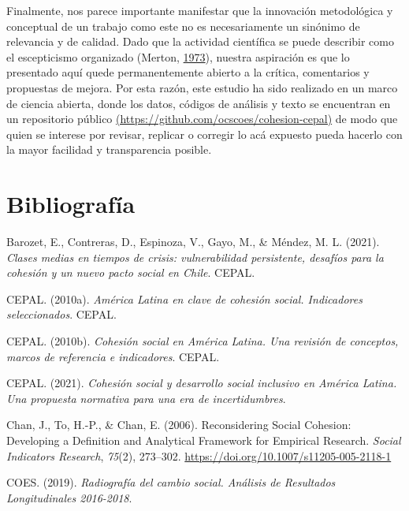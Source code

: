 \documentclass[
  12pt,
]{book}
\begin{document}
Finalmente, nos parece importante manifestar que la innovación metodológica y conceptual de un trabajo como este no es necesariamente un sinónimo de relevancia y de calidad. Dado que la actividad científica se puede describir como el escepticismo organizado (Merton, \protect\hyperlink{ref-merton_sociology_1973}{1973}), nuestra aspiración es que lo presentado aquí quede permanentemente abierto a la crítica, comentarios y propuestas de mejora. Por esta razón, este estudio ha sido realizado en un marco de ciencia abierta, donde los datos, códigos de análisis y texto se encuentran en un repositorio público \href{https://github.com/ocscoes/cohesion-cepal}{(https://github.com/ocscoes/cohesion-cepal)} de modo que quien se interese por revisar, replicar o corregir lo acá expuesto pueda hacerlo con la mayor facilidad y transparencia posible.

\hypertarget{bibliografuxeda}{%
\chapter*{Bibliografía}\label{bibliografuxeda}}

\hypertarget{refs}{}
\leavevmode\hypertarget{ref-barozet_clases_2021}{}%
Barozet, E., Contreras, D., Espinoza, V., Gayo, M., \& Méndez, M. L. (2021). \emph{Clases medias en tiempos de crisis: vulnerabilidad persistente, desafíos para la cohesión y un nuevo pacto social en Chile}. CEPAL.

\leavevmode\hypertarget{ref-cepal_america_2010}{}%
CEPAL. (2010a). \emph{América Latina en clave de cohesión social. Indicadores seleccionados}. CEPAL.

\leavevmode\hypertarget{ref-cepal_cohesion_2010}{}%
CEPAL. (2010b). \emph{Cohesión social en América Latina. Una revisión de conceptos, marcos de referencia e indicadores}. CEPAL.

\leavevmode\hypertarget{ref-cepal_cohesion_2021}{}%
CEPAL. (2021). \emph{Cohesión social y desarrollo social inclusivo en América Latina. Una propuesta normativa para una era de incertidumbres}.

\leavevmode\hypertarget{ref-chan_reconsidering_2006}{}%
Chan, J., To, H.-P., \& Chan, E. (2006). Reconsidering Social Cohesion: Developing a Definition and Analytical Framework for Empirical Research. \emph{Social Indicators Research}, \emph{75}(2), 273--302. \url{https://doi.org/10.1007/s11205-005-2118-1}

\leavevmode\hypertarget{ref-coes_radiografia_2019}{}%
COES. (2019). \emph{Radiografía del cambio social. Análisis de Resultados Longitudinales 2016-2018}.
\end{document}
